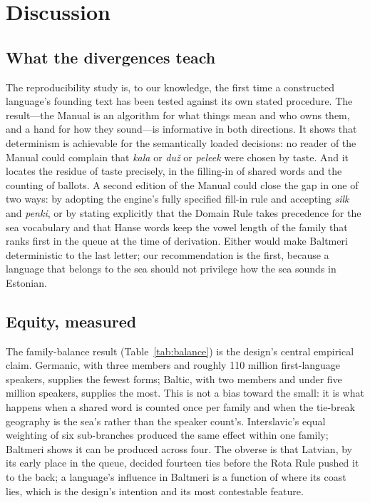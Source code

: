 \section{Discussion}\label{sec:discussion}

\subsection{What the divergences teach}
The reproducibility study is, to our knowledge, the first time a constructed language's founding text has been tested against its own stated procedure. The result---the Manual is an algorithm for what things mean and who owns them, and a hand for how they sound---is informative in both directions. It shows that determinism is achievable for the semantically loaded decisions: no reader of the Manual could complain that \emph{kala} or \emph{duž} or \emph{peleek} were chosen by taste. And it locates the residue of taste precisely, in the filling-in of shared words and the counting of ballots. A second edition of the Manual could close the gap in one of two ways: by adopting the engine's fully specified fill-in rule and accepting \emph{silk} and \emph{penki}, or by stating explicitly that the Domain Rule takes precedence for the sea vocabulary and that Hanse words keep the vowel length of the family that ranks first in the queue at the time of derivation. Either would make Baltmeri deterministic to the last letter; our recommendation is the first, because a language that belongs to the sea should not privilege how the sea sounds in Estonian.

\subsection{Equity, measured}
The family-balance result (Table~\ref{tab:balance}) is the design's central empirical claim. Germanic, with three members and roughly 110 million first-language speakers, supplies the fewest forms; Baltic, with two members and under five million speakers, supplies the most. This is not a bias toward the small: it is what happens when a shared word is counted once per family and when the tie-break geography is the sea's rather than the speaker count's. Interslavic's equal weighting of six sub-branches \citep{merunka2019} produced the same effect within one family; Baltmeri shows it can be produced across four. The obverse is that Latvian, by its early place in the queue, decided fourteen ties before the Rota Rule pushed it to the back; a language's influence in Baltmeri is a function of where its coast lies, which is the design's intention and its most contestable feature.

